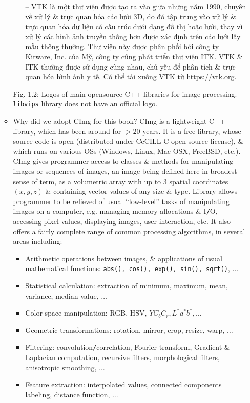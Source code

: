 \documentclass{article}
\begin{document}
\begin{itemize}
\begin{itemize}
\begin{itemize}
            -- VTK là một thư viện được tạo ra vào giữa những năm 1990, chuyên về xử lý \& trực quan hóa các lưới 3D, do đó tập trung vào xử lý \& trực quan hóa dữ liệu có cấu trúc dưới dạng đồ thị hoặc lưới, thay vì xử lý các hình ảnh truyền thống hơn được xác định trên các lưới lấy mẫu thông thường. Thư viện này được phân phối bởi công ty Kitware, Inc. của Mỹ, công ty cũng phát triển thư viện ITK. VTK \& ITK thường được sử dụng cùng nhau, chủ yếu để phân tích \& trực quan hóa hình ảnh y tế. Có thể tải xuống VTK từ \url{https://vtk.org}.
        \end{itemize}
        {\sf Fig. 1.2: Logos of main opensource C++ libraries for image processing. {\tt libvips} library does not have an official logo.}
        \item {\sf Why did we adopt CImg for this book?} CImg is a lightweight C++ library, which has been around for $> 20$ years. It is a free library, whose source code is open (distributed under CeCILL-C open-source license), \& which runs on various OSs (Windows, Linux, Mac OSX, FreeBSD, etc.). CImg gives programmer access to classes \& methods for manipulating images or sequences of images, an image being defined here in broadest sense of term, as a volumetric array with up to 3 spatial coordinates $(x,y,z)$ \& containing vector values of any size \& type. Library allows programmer to be relieved of usual ``low-level'' tasks of manipulating images on a computer, e.g. managing memory allocations \& I{\tt/}O, accessing pixel values, displaying images, user interaction, etc. It also offers a fairly complete range of common processing algorithms, in several areas including:
        \begin{itemize}
            \item Arithmetic operations between images, \& applications of usual mathematical functions: {\tt abs(), cos(), exp(), sin(), sqrt()}, $\ldots$
            \item Statistical calculation: extraction of minimum, maximum, mean, variance, median value, $\ldots$
            \item Color space manipulation: RGB, HSV, $YC_bC_r,L^*a^*b^*,\ldots$
            \item Geometric transformations: rotation, mirror, crop, resize, warp, $\ldots$
            \item Filtering: convolution{\tt/}correlation, Fourier transform, Gradient \& Laplacian computation, recursive filters, morphological filters, anisotropic smoothing, $\ldots$
            \item Feature extraction: interpolated values, connected components labeling, distance function, $\ldots$

\end{itemize}
\end{itemize}
\end{itemize}
\end{document}
